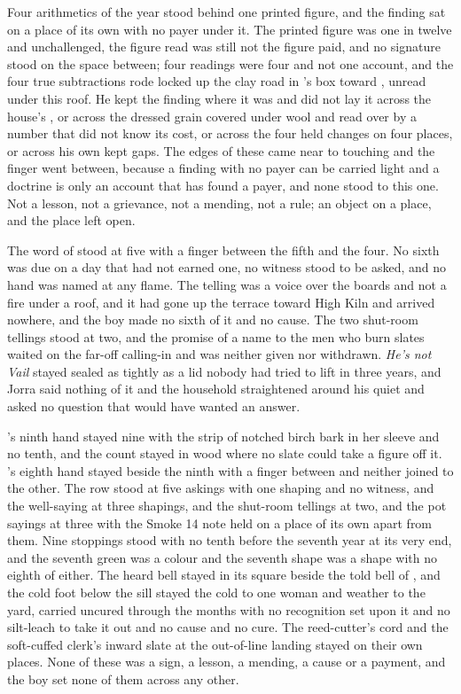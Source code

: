 Four arithmetics of the year stood behind one printed figure, and the finding sat on a place of its own with no payer under it. The printed figure was one in twelve and unchallenged, the figure read was still not the figure paid, and no signature stood on the space between; four readings were four and not one account, and the four true subtractions rode locked up the clay road in 's box toward , unread under this roof. He kept the finding where it was and did not lay it across the house's , or across the dressed grain covered under wool and read over by a number that did not know its cost, or across the four held changes on four places, or across his own kept gaps. The edges of these came near to touching and the finger went between, because a finding with no payer can be carried light and a doctrine is only an account that has found a payer, and none stood to this one. Not a lesson, not a grievance, not a mending, not a rule; an object on a place, and the place left open.

The word of  stood at five with a finger between the fifth and the four. No sixth was due on a day that had not earned one, no witness stood to be asked, and no hand was named at any flame. The telling was a voice over the boards and not a fire under a roof, and it had gone up the terrace toward High Kiln and arrived nowhere, and the boy made no sixth of it and no cause. The two shut-room tellings stood at two, and the promise of a name to the men who burn slates waited on the far-off calling-in and was neither given nor withdrawn. \emph{He's not Vail} stayed sealed as tightly as a lid nobody had tried to lift in three years, and Jorra said nothing of it and the household straightened around his quiet and asked no question that would have wanted an answer.

's ninth hand stayed nine with the strip of notched birch bark in her sleeve and no tenth, and the count stayed in wood where no slate could take a figure off it. 's eighth hand stayed beside the ninth with a finger between and neither joined to the other. The row stood at five askings with one shaping and no witness, and the well-saying at three shapings, and the shut-room tellings at two, and the pot sayings at three with the Smoke 14 note held on a place of its own apart from them. Nine stoppings stood with no tenth before the seventh year at its very end, and the seventh green was a colour and the seventh shape was a shape with no eighth of either. The heard bell stayed in its square beside the told bell of , and the cold foot below the sill stayed the cold to one woman and weather to the yard, carried uncured through the months with no recognition set upon it and no silt-leach to take it out and no cause and no cure. The reed-cutter's cord and the soft-cuffed clerk's inward slate at the out-of-line landing stayed on their own places. None of these was a sign, a lesson, a mending, a cause or a payment, and the boy set none of them across any other.

